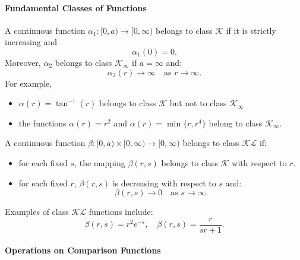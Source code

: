 \paragraph{Fundamental Classes of Functions}


A continuous function $\alpha_1 : [0, a) \to [0,\infty)$ belongs to class $\mathcal{K}$ if it is strictly increasing and %
\begin{equation*}
    \alpha_1(0) = 0.
\end{equation*}
\newpar{}
Moreover, $\alpha_2$ belongs to class $\mathcal{K}_\infty$ if $a = \infty$ and:
\noindent\begin{equation*}
    \alpha_2(r) \to \infty \quad \text{as } r \to \infty.
\end{equation*}
For example,
\begin{itemize}
    \item $\alpha(r) = \tan^{-1}(r)$ belongs to class $\mathcal{K}$ but not to class $\mathcal{K}_\infty$
    \item the functions $\alpha(r) = r^2$ and $\alpha(r) = \min\{r, r^4\}$ belong to class $\mathcal{K}_\infty$.
\end{itemize}

\newpar{}

A continuous function $\beta : [0, a) \times [0,\infty) \to [0,\infty)$ belongs to class $\mathcal{K}\mathcal{L}$ if: %
\begin{itemize}
    \item for each fixed $s$, the mapping $\beta(r, s)$ belongs to class $\mathcal{K}$ with respect to $r$.
    \item for each fixed $r$, $\beta(r, s)$ is decreasing with respect to $s$ and:
          \noindent\begin{equation*}
              \beta(r, s) \to 0 \quad \text{as } s \to \infty.
          \end{equation*}
\end{itemize}
Examples of class $\mathcal{K}\mathcal{L}$ functions include:
\noindent\begin{equation*}
    \beta(r, s) = r^2 e^{-s}, \quad \beta(r, s) = \frac{r}{s r + 1}.
\end{equation*}

\paragraph{Operations on Comparison Functions}


